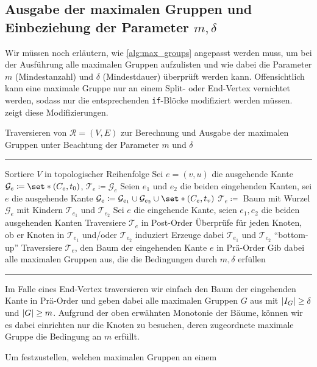 \subsection{Ausgabe der maximalen Gruppen und Einbeziehung der Parameter $m,\delta$} %
\label{sub:ausgabe_der_maximalen_gruppen_und_einbeziehung_der_parameter_m_delta}
Wir müssen noch erläutern, wie \cref{alg:max_groups} angepasst werden muss, um bei der Ausführung alle maximalen Gruppen aufzulisten und wie dabei die Parameter $m$ (Mindestanzahl) und $\delta$ (Mindestdauer) überprüft werden kann.
Offensichtlich kann eine maximale Gruppe nur an einem Split- oder End-Vertex vernichtet werden, sodass nur die entsprechenden \texttt{if}-Blöcke modifiziert werden müssen.
 zeigt diese Modifizierungen.
\begin{algorithm}[hbt]
	\caption{Traversieren von $\mathcal{R}=(V,E)$ zur Berechnung und Ausgabe der maximalen Gruppen unter Beachtung der Parameter $m$ und $\delta$} \label{alg:max_groups_final}
	\vspace{.5em}
	\hrule\vspace{.5em}
	
	\begin{algorithmic}
		\State Sortiere $V$ in topologischer Reihenfolge
			\State Sei $e=(v,u)$ die ausgehende Kante
			\State $\mathcal{G}_e \coloneqq \set*{(C_e,t_0)}$, $\mathcal{T}_e \coloneqq \mathcal{G}_e$
			\State Seien $e_1$ und $e_2$ die beiden eingehenden Kanten, sei $e$ die ausgehende Kante
			\State $\mathcal{G}_e \coloneqq \mathcal{G}_{e_1} \cup \mathcal{G}_{e_2} \cup \set*{(C_e,t_v)}$
			\State $\mathcal{T}_e \coloneqq$ Baum mit Wurzel $\mathcal{G}_e$ mit Kindern $\mathcal{T}_{e_1}$ und $\mathcal{T}_{e_2}$
			\State Sei $e$ die eingehende Kante, seien $e_1,e_2$ die beiden ausgehenden Kanten
			\State Traversiere $\mathcal{T}_e$ in Post-Order
			\State Überprüfe für jeden Knoten, ob er Knoten in $\mathcal{T}_{e_1}$ und/oder $\mathcal{T}_{e_2}$ induziert
			\State Erzeuge dabei $\mathcal{T}_{e_1}$ und $\mathcal{T}_{e_2}$ \enquote{bottom-up}
			\State Traversiere $\mathcal{T}_e$, den Baum der eingehenden Kante $e$ in Prä-Order
			\State Gib dabei alle maximalen Gruppen aus, die die Bedingungen durch $m,\delta$ erfüllen
			\EndIf
		\EndFor
		\EndProcedure
	\end{algorithmic}
	\hrule
\end{algorithm}

Im Falle eines End-Vertex traversieren wir einfach den Baum der eingehenden Kante in Prä-Order und geben dabei alle maximalen Gruppen $G$ aus mit $\abs{I_G}\ge \delta$ und $\abs*{G}\ge m$.
Aufgrund der oben erwähnten Monotonie der Bäume, können wir es dabei einrichten nur die Knoten zu besuchen, deren zugeordnete maximale Gruppe die Bedingung an $m$ erfüllt.

Um festzustellen, welchen maximalen Gruppen an einem






